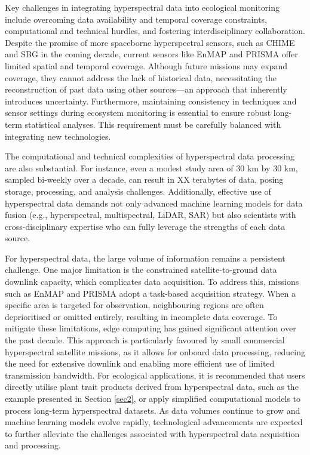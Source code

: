 \documentclass[pdflatex,sn-mathphys-num]{sn-jnl}%
\theoremstyle{thmstyleone}%
\theoremstyle{thmstyletwo}%
\theoremstyle{thmstylethree}%
\begin{document}
Key challenges in integrating hyperspectral data into ecological monitoring include overcoming data availability and temporal coverage constraints, computational and technical hurdles, and fostering interdisciplinary collaboration. Despite the promise of more spaceborne hyperspectral sensors, such as CHIME and SBG in the coming decade, current sensors like EnMAP and PRISMA offer limited spatial and temporal coverage. Although future missions may expand coverage, they cannot address the lack of historical data, necessitating the reconstruction of past data using other sources—an approach that inherently introduces uncertainty. Furthermore, maintaining consistency in techniques and sensor settings during ecosystem monitoring is essential to ensure robust long-term statistical analyses. This requirement must be carefully balanced with integrating new technologies.

The computational and technical complexities of hyperspectral data processing are also substantial. For instance, even a modest study area of 30 km by 30 km, sampled bi-weekly over a decade, can result in XX terabytes of data, posing storage, processing, and analysis challenges. Additionally, effective use of hyperspectral data demands not only advanced machine learning models for data fusion (e.g., hyperspectral, multispectral, LiDAR, SAR) but also scientists with cross-disciplinary expertise who can fully leverage the strengths of each data source. 

For hyperspectral data, the large volume of information remains a persistent challenge. One major limitation is the constrained satellite-to-ground data downlink capacity, which complicates data acquisition. To address this, missions such as EnMAP and PRISMA adopt a task-based acquisition strategy. When a specific area is targeted for observation, neighbouring regions are often deprioritised or omitted entirely, resulting in incomplete data coverage. To mitigate these limitations, edge computing has gained significant attention over the past decade. This approach is particularly favoured by small commercial hyperspectral satellite missions, as it allows for onboard data processing, reducing the need for extensive downlink and enabling more efficient use of limited transmission bandwidth. For ecological applications, it is recommended that users directly utilise plant trait products derived from hyperspectral data, such as the example presented in Section \ref{sec2}, or apply simplified computational models to process long-term hyperspectral datasets. As data volumes continue to grow and machine learning models evolve rapidly, technological advancements are expected to further alleviate the challenges associated with hyperspectral data acquisition and processing.
\end{document}
